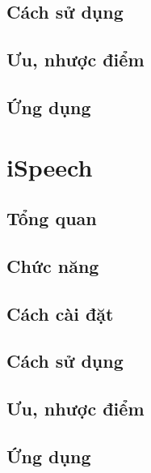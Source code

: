 \subsection{Cách sử dụng}
\subsection{Ưu, nhược điểm}
\subsection{Ứng dụng}
\section{iSpeech}
\subsection{Tổng quan}
\subsection{Chức năng}
\subsection{Cách cài đặt}
\subsection{Cách sử dụng}
\subsection{Ưu, nhược điểm}
\subsection{Ứng dụng}
